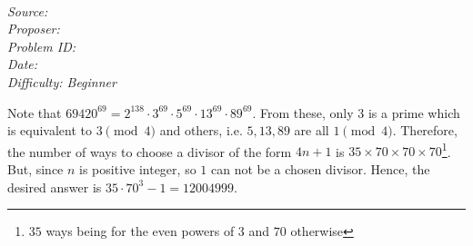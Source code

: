
\SSbreak\\
\emph{Source: \Cop}\\
\emph{Proposer: \Pnjoy}\\
\emph{Problem ID: }\\
\emph{Date: }\\
\emph{Difficulty: Beginner}\\
\SSbreak

\bigskip

\begin{solution}\hfil\medskip

  Note that $69420^{69}=2^{138}\cdot 3^{69}\cdot 5^{69}\cdot 13^{69}\cdot 89^{69}$. From these, only $3$ is a prime which is equivalent to $3 \pmod{4}$ and others, i.e. $5, 13, 89$ are all $1\pmod{4}$. Therefore, the number of ways to choose a divisor of the form $4n+1$ is $35 \times 70\times 70\times 70$\footnote{$35$ ways being for the even powers of $3$ and $70$ otherwise}. But, since $n$ is positive integer, so $1$ can not be a chosen divisor. Hence, the desired answer is $35\cdot 70^3 - 1 = \boxed{12004999}$.
\end{solution}\bigskip
